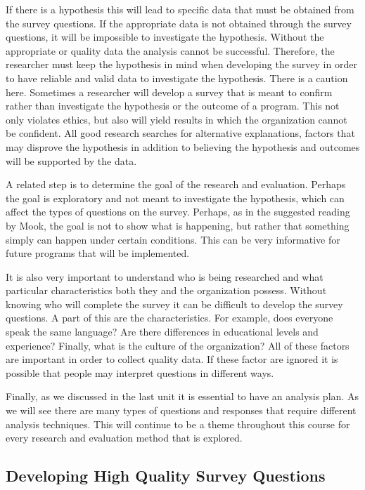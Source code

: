 \documentclass[]{book}
\theoremstyle{definition}
\theoremstyle{definition}
\theoremstyle{definition}
\theoremstyle{remark}
\begin{document}
If there is a hypothesis this will lead to specific data that must be
obtained from the survey questions. If the appropriate data is not
obtained through the survey questions, it will be impossible to
investigate the hypothesis. Without the appropriate or quality data the
analysis cannot be successful. Therefore, the researcher must keep the
hypothesis in mind when developing the survey in order to have reliable
and valid data to investigate the hypothesis. There is a caution here.
Sometimes a researcher will develop a survey that is meant to confirm
rather than investigate the hypothesis or the outcome of a program. This
not only violates ethics, but also will yield results in which the
organization cannot be confident. All good research searches for
alternative explanations, factors that may disprove the hypothesis in
addition to believing the hypothesis and outcomes will be supported by
the data.

A related step is to determine the goal of the research and evaluation.
Perhaps the goal is exploratory and not meant to investigate the
hypothesis, which can affect the types of questions on the survey.
Perhaps, as in the suggested reading by Mook, the goal is not to show
what is happening, but rather that something simply can happen under
certain conditions. This can be very informative for future programs
that will be implemented.

It is also very important to understand who is being researched and what
particular characteristics both they and the organization possess.
Without knowing who will complete the survey it can be difficult to
develop the survey questions. A part of this are the characteristics.
For example, does everyone speak the same language? Are there
differences in educational levels and experience? Finally, what is the
culture of the organization? All of these factors are important in order
to collect quality data. If these factor are ignored it is possible that
people may interpret questions in different ways.

Finally, as we discussed in the last unit it is essential to have an
analysis plan. As we will see there are many types of questions and
responses that require different analysis techniques. This will continue
to be a theme throughout this course for every research and evaluation
method that is explored.

\hypertarget{developing-high-quality-survey-questions}{%
\subsection{Developing High Quality Survey
Questions}\label{developing-high-quality-survey-questions}}
\end{document}
